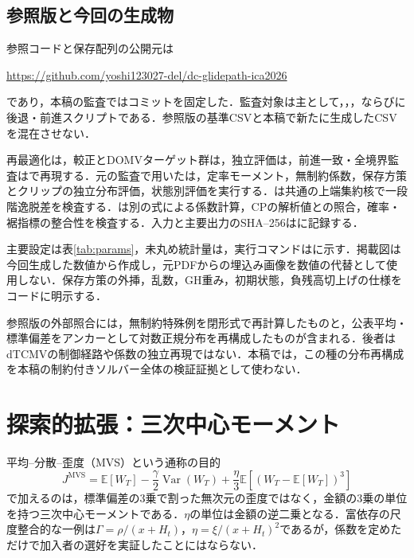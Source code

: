 \documentclass[10pt,a4paper]{article}
\numberwithin{equation}{section}
\numberwithin{table}{section}
\numberwithin{figure}{section}
\theoremstyle{plain}
\theoremstyle{definition}
\newcommand{\E}{\mathbb{E}}
\DeclareMathOperator{\Var}{Var}
\begin{document}
\subsection{参照版と今回の生成物}
参照コードと保存配列の公開元は
\begin{center}\url{https://github.com/yoshi123027-del/dc-glidepath-ica2026}\end{center}
であり，本稿の監査ではコミットを固定した．監査対象は主として，，，ならびに後退・前進スクリプトである．参照版の基準CSVと本稿で新たに生成したCSVを混在させない．

再最適化は，較正とDOMVターゲット群は，独立評価は，前進一致・全境界監査はで再現する．元の監査で用いたは，定率モーメント，無制約係数，保存方策とクリップの独立分布評価，状態別評価を実行する．は共通の上端集約核で一段階逸脱差を検査する．は別の式による係数計算，CPの解析値との照合，確率・裾指標の整合性を検査する．入力と主要出力のSHA--256はに記録する．

主要設定は表\ref{tab:params}，未丸め統計量は，実行コマンドはに示す．掲載図は今回生成した数値から作成し，元PDFからの埋込み画像を数値の代替として使用しない．保存方策の外挿，乱数，GH重み，初期状態，負残高切上げの仕様をコードに明示する．

参照版の外部照合には，無制約特殊例を閉形式で再計算したものと，公表平均・標準偏差をアンカーとして対数正規分布を再構成したものが含まれる．後者はdTCMVの制御経路や係数の独立再現ではない．本稿では，この種の分布再構成を本稿の制約付きソルバー全体の検証証拠として使わない．

\section{探索的拡張：三次中心モーメント}
\label{app:mvs}
平均--分散--歪度（MVS）という通称の目的
\begin{equation}
J^{\mathrm{MVS}}=\E[W_T]-\frac\gamma2\Var(W_T)
+\frac\eta3\E[(W_T-\E[W_T])^3]
\end{equation}
で加えるのは，標準偏差の3乗で割った無次元の歪度ではなく，金額の3乗の単位を持つ三次中心モーメントである．$\eta$の単位は金額の逆二乗となる．富依存の尺度整合的な一例は$\Gamma=\rho/(x+H_t)$，$\eta=\xi/(x+H_t)^2$であるが，係数を定めただけで加入者の選好を実証したことにはならない．
\end{document}
